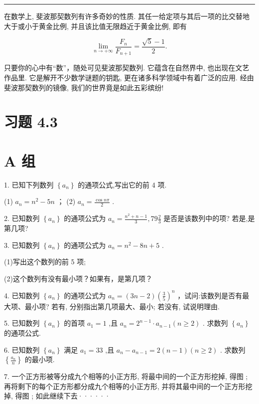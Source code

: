 \documentclass[10pt]{article}
\newcommand{\HRule}{\begin{center}\rule{0.9\linewidth}{0.2mm}\end{center}}
\newcommand*\circled[1]{\tikz[baseline=(char.base)]{\node[shape=circle,draw,inner sep=1.5pt] (char) {\small #1};}}
\begin{document}
\HRule

在数学上, 斐波那契数列有许多奇妙的性质. 其任一给定项与其后一项的比交替地大于或小于黄金比例, 并且该比值无限趋近于黄金比例, 即有

\[
\mathop{\lim }\limits_{{n \rightarrow   + \infty }}\frac{{F}_{n}}{{F}_{n + 1}} = \frac{\sqrt{5} - 1}{2}.
\]

只要你的心中有“数”，随处可见斐波那契数列. 它蕴含在自然界中, 也出现在文艺作品里. 它是解开不少数学谜题的钥匙, 更在诸多科学领域中有着广泛的应用. 经由斐波那契数列的镜像, 我们的世界竟是如此五彩缤纷!

\section*{习题 4.3}

\section*{A 组}

1. 已知下列数列 \(\left\{  {a}_{n}\right\}\) 的通项公式,写出它的前 4 项.

(1) \({a}_{n} = {n}^{2} - {5n}\) ； (2) \({a}_{n} = \frac{\cos {n\pi }}{2}\) .

2. 已知数列 \(\left\{  {a}_{n}\right\}\) 的通项公式为 \({a}_{n} = \frac{{n}^{2} + n - 1}{3},{79}\frac{2}{3}\) 是否是该数列中的项? 若是,是第几项?

3. 已知数列 \(\left\{  {a}_{n}\right\}\) 的通项公式为 \({a}_{n} = {n}^{2} - {8n} + 5\) .

(1)写出这个数列的前 5 项;

(2)这个数列有没有最小项？如果有，是第几项？

4. 已知数列 \(\left\{  {a}_{n}\right\}\) 的通项公式为 \({a}_{n} = \left( {{3n} - 2}\right) {\left( \frac{3}{5}\right) }^{n}\) ，试问:该数列是否有最大项、最小项? 若有, 分别指出第几项最大、最小; 若没有, 试说明理由.

5. 已知数列 \(\left\{  {a}_{n}\right\}\) 的首项 \({a}_{1} = 1\) ,且 \({a}_{n} = {2}^{n - 1} \cdot  {a}_{n - 1}\left( {n \geq  2}\right)\) . 求数列 \(\left\{  {a}_{n}\right\}\) 的通项公式.

6. 已知数列 \(\left\{  {a}_{n}\right\}\) 满足 \({a}_{1} = {33}\) ,且 \({a}_{n} - {a}_{n - 1} = 2\left( {n - 1}\right) \left( {n \geq  2}\right)\) . 求数列 \(\left\{  \frac{{a}_{n}}{n}\right\}\) 的最小项.

7. 一个正方形被等分成九个相等的小正方形, 将最中间的一个正方形挖掉, 得图 \circled{1} ; 再将剩下的每个正方形都分成九个相等的小正方形, 并将其最中间的一个正方形挖掉, 得图 \circled{2} ; 如此继续下去······
\end{document}
